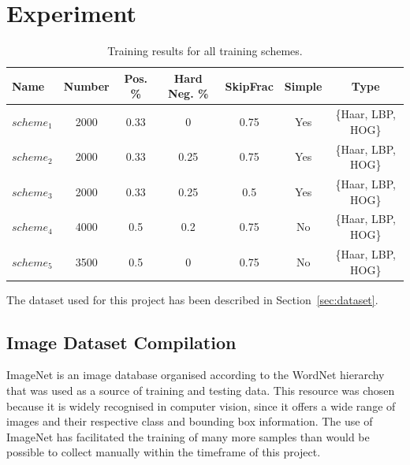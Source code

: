 \documentclass{llncs}
\begin{document}
	\section{Experiment} {
	\label{sec:experiment}


		\begin{table}
			\centering
			\caption{Training results for all training schemes.}
			\label{tab:training_schemes}
			\begin{tabularx}{\textwidth}{@{}lcccccc@{}}
				\toprule
				\textbf{Name} & \textbf{Number} & \textbf{Pos. \%} & \textbf{Hard Neg. \%} & \textbf{SkipFrac} & \textbf{Simple} & \textbf{Type}  \\
				\midrule
					\(scheme_1\) & 2000 & 0.33 & 0     & 0.75 & Yes & \{Haar, LBP, HOG\} \\
					\(scheme_2\) & 2000 & 0.33 & 0.25  & 0.75 & Yes & \{Haar, LBP, HOG\} \\
					\(scheme_3\) & 2000 & 0.33 & 0.25  & 0.5  & Yes & \{Haar, LBP, HOG\} \\
					\(scheme_4\) & 4000 & 0.5  & 0.2   & 0.75 & No  & \{Haar, LBP, HOG\} \\
					\(scheme_5\) & 3500 & 0.5  & 0     & 0.75 & No  & \{Haar, LBP, HOG\} \\
				\bottomrule
			\end{tabularx}
		\end{table}


		The dataset used for this project has been described in Section~\ref{sec:dataset}.

		\subsection{Image Dataset Compilation} {
		\label{sec:dataset}

			ImageNet is an image database organised according to the WordNet hierarchy \citep{imagenet_cvpr09, fellbaum1998wordnet} that was used as a source of training and testing data. This resource was chosen because it is widely recognised in computer vision, since it offers a wide range of images and their respective class and bounding box information. The use of ImageNet has facilitated the training of many more samples than would be possible to collect manually within the timeframe of this project.

}}
\end{document}
